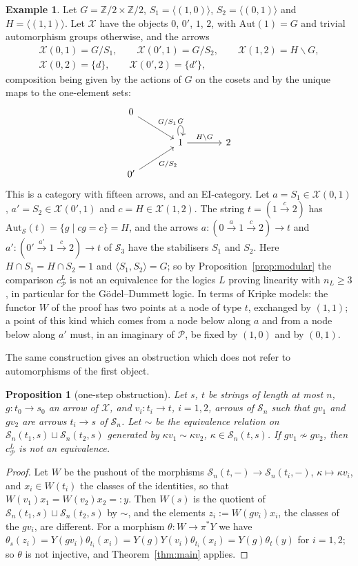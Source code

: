 \documentclass[11pt]{amsart}
\newtheorem{prop}[thm]{Proposition}
\theoremstyle{definition}
\newtheorem{ex}[thm]{Example}
\newcommand{\Aut}{\mathrm{Aut}}
\newcommand{\cX}{\mathcal X}
\newcommand{\cP}{\mathcal P}
\newcommand{\cS}{\mathcal S}
\begin{document}
\begin{ex}\label{ex:modular}
Let $G=\mathbb Z/2\times\mathbb Z/2$, $S_1=\langle(1,0)\rangle$,
$S_2=\langle(0,1)\rangle$ and $H=\langle(1,1)\rangle$. Let $\cX$ have
the objects $0$, $0'$, $1$, $2$, with $\Aut(1)=G$ and trivial
automorphism groups otherwise, and the arrows
\begin{gather*}
\cX(0,1)=G/S_1,\qquad\cX(0',1)=G/S_2,\qquad\cX(1,2)=H\backslash G,\\
\cX(0,2)=\{d\},\qquad\cX(0',2)=\{d'\},
\end{gather*}
composition being given by the actions of $G$ on the cosets and by the
unique maps to the one-element sets:
\[
\begin{tikzcd}[column sep=large]
0\arrow[dr,"G/S_1"]&&\\
&1\arrow[r,"H\backslash G"]\arrow[loop above,"G"]&2\\
0'\arrow[ur,"G/S_2"']&&
\end{tikzcd}
\]
This is a category with fifteen arrows, and an EI-category. Let
$a=S_1\in\cX(0,1)$, $a'=S_2\in\cX(0',1)$ and $c=H\in\cX(1,2)$. The
string $t=(1\xrightarrow{c}2)$ has $\Aut_{\cS}(t)=\{g\mid cg=c\}=H$,
and the arrows $a\colon(0\xrightarrow{a}1\xrightarrow{c}2)\to t$ and
$a'\colon(0'\xrightarrow{a'}1\xrightarrow{c}2)\to t$ of $\cS_3$ have
the stabilisers $S_1$ and $S_2$. Here $H\cap S_1=H\cap S_2=1$ and
$\langle S_1,S_2\rangle=G$; so by Proposition~\ref{prop:modular} the
comparison $c^L_\cP$ is not an equivalence for the logics $L$ proving
linearity with $n_L\ge3$, in particular for the G\"odel--Dummett
logic. In terms of Kripke models: the functor $W$ of the proof has two
points at a node of type $t$, exchanged by $(1,1)$; a point of this
kind which comes from a node below along $a$ and from a node below
along $a'$ must, in an imaginary of $\cP$, be fixed by $(1,0)$ and by
$(0,1)$.
\end{ex}

The same construction gives an obstruction which does not refer to
automorphisms of the first object.

\begin{prop}[one-step obstruction]\label{prop:onestep}
Let $s$, $t$ be strings of length at most $n$, $g\colon t_0\to s_0$ an
arrow of $\cX$, and $v_i\colon t_i\to t$, $i=1,2$, arrows of $\cS_n$
such that $gv_1$ and $gv_2$ are arrows $t_i\to s$ of $\cS_n$. Let
$\sim$ be the equivalence relation on $\cS_n(t_1,s)\sqcup\cS_n(t_2,s)$
generated by $\kappa v_1\sim\kappa v_2$, $\kappa\in\cS_n(t,s)$. If
$gv_1\not\sim gv_2$, then $c^L_\cP$ is not an equivalence.
\end{prop}
\begin{proof}
Let $W$ be the pushout of the morphisms $\cS_n(t,-)\to\cS_n(t_i,-)$,
$\kappa\mapsto\kappa v_i$, and $x_i\in W(t_i)$ the classes of the
identities, so that $W(v_1)x_1=W(v_2)x_2=:y$. Then $W(s)$ is the
quotient of $\cS_n(t_1,s)\sqcup\cS_n(t_2,s)$ by $\sim$, and the
elements $z_i:=W(gv_i)x_i$, the classes of the $gv_i$, are different.
For a morphism $\theta\colon W\to\pi^*Y$ we have
$\theta_s(z_i)=Y(gv_i)\theta_{t_i}(x_i)=Y(g)Y(v_i)\theta_{t_i}(x_i)=
Y(g)\theta_t(y)$ for $i=1,2$; so $\theta$ is not injective, and
Theorem~\ref{thm:main} applies.
\end{proof}
\end{document}
